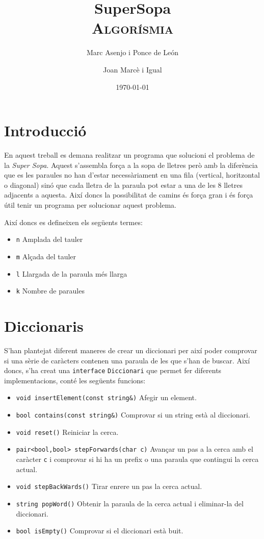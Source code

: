 ﻿\documentclass{article}
\title{
	\Huge
	\textbf{SuperSopa} \\ 
	\scshape Algorísmia
}
\author{
	Marc Asenjo i Ponce de León \and 
	Joan Marcè i Igual
}
\date{\today}
\begin{document}
\maketitle


\section{Introducció}
En aquest treball es demana realitzar un programa que solucioni el problema de la \emph{Super Sopa}. Aquest s'assembla força a la sopa de lletres però amb la diferència que es les paraules no han d'estar necessàriament en una fila (vertical, horitzontal o diagonal) sinó que cada lletra de la paraula pot estar a una de les 8 lletres adjacents a aquesta. Així doncs la possibilitat de camins és força gran i és força útil tenir un programa per solucionar aquest problema.

Així doncs es defineixen els següents termes:

\begin{itemize}
	\item \verb|n| Amplada del tauler
	\item \verb|m| Alçada del tauler
	\item \verb|l| Llargada de la paraula més llarga
	\item \verb|k| Nombre de paraules
\end{itemize}

\section{Diccionaris}
S'han plantejat diferent maneres de crear un diccionari per així poder comprovar si una sèrie de caràcters contenen una paraula de les que s'han de buscar. Així doncs, s'ha creat una \verb|interface| \verb|Diccionari| que permet fer diferents implementacions, conté les següents funcions:

\begin{itemize}
	\item \verb|void insertElement(const string&)| Afegir un element.
	\item \verb|bool contains(const string&)| Comprovar si un string està al diccionari.
	\item \verb|void reset()| Reiniciar la cerca.
	\item \verb|pair<bool,bool> stepForwards(char c)| Avançar un pas a la cerca amb el caràcter \verb|c| i comprovar si hi ha un prefix o una paraula que contingui la cerca actual.
	\item \verb|void stepBackWards()| Tirar enrere un pas la cerca actual.
	\item \verb|string popWord()| Obtenir la paraula de la cerca actual i eliminar-la del diccionari.
	\item \verb|bool isEmpty()| Comprovar si el diccionari està buit.
\end{itemize}
	
\end{document}
